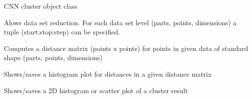 \documentclass[letterpaper,10pt,english]{sphinxmanual}
\begin{document}
\begin{fulllineitems}
\label{\detokenize{documentation:cnn.CNN}}
CNN cluster object class

\begin{fulllineitems}
\label{\detokenize{documentation:cnn.CNN.cut}}
Alows data set reduction.  For each data set level (parts,
points, dimensions) a tuple (start:stop:step) can be
specified.

\end{fulllineitems}


\begin{fulllineitems}
\label{\detokenize{documentation:cnn.CNN.dist}}
Computes a distance matrix (points x points) for points in given data
of standard shape (parts, points, dimensions)

\end{fulllineitems}


\begin{fulllineitems}
\label{\detokenize{documentation:cnn.CNN.dist_hist}}
Shows/saves a histogram plot for distances in a given distance
matrix

\end{fulllineitems}


\begin{fulllineitems}
\label{\detokenize{documentation:cnn.CNN.evaluate}}
Shows/saves a 2D histogram or scatter plot of a cluster result


\end{fulllineitems}
\end{fulllineitems}
\end{document}
